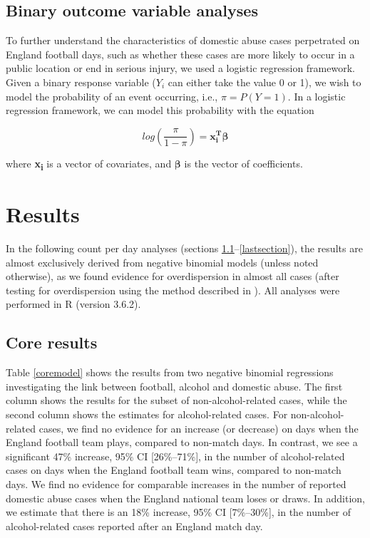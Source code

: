 \documentclass[12pt, a4paper]{article}
\newcommand{\vect}[1]{\boldsymbol{#1}}
\begin{document}
\subsection{Binary outcome variable analyses}

To further understand the characteristics of domestic abuse cases perpetrated on England football days, such as whether these cases are more likely to occur in a public location or end in serious injury, we used a logistic regression framework.
Given a binary response variable ($Y_{i}$ can either take the value 0 or 1), we wish to model the probability of an event occurring, i.e., $\pi = P(Y = 1)$.
In a logistic regression framework, we can model this probability with the equation

\begin{equation}
log(\frac{\pi}{1-\pi})= \vect{x_i^{T}}\vect{\beta}
\end{equation}

where \textbf{x\textsubscript{i}} is a vector of covariates, and $\boldsymbol{\beta}$ is the vector of coefficients.


\newpage

\section{Results}

In the following count per day analyses (sections \ref{firstsection}--\ref{lastsection}), the results are almost exclusively derived from negative binomial models (unless noted otherwise), as we found evidence for overdispersion in almost all cases (after testing for overdispersion using the method described in ). All analyses were performed in R (version 3.6.2).


\subsection{Core results} \label{firstsection}

Table \ref{coremodel} shows the results from two negative binomial regressions investigating the link between football, alcohol and domestic abuse. The first column shows the results for the subset of non-alcohol-related cases, while the second column shows the estimates for alcohol-related cases. For non-alcohol-related cases, we find no evidence for an increase (or decrease) on days when the England football team plays, compared to non-match days. In contrast, we see a significant 47\% increase, 95\% CI [26\%--71\%], in the number of alcohol-related cases on days when the England football team wins, compared to non-match days. We find no evidence for comparable increases in the number of reported domestic abuse cases when the England national team loses or draws. In addition, we estimate that there is an 18\% increase, 95\% CI [7\%--30\%], in the number of alcohol-related cases reported after an England match day.
\end{document}
